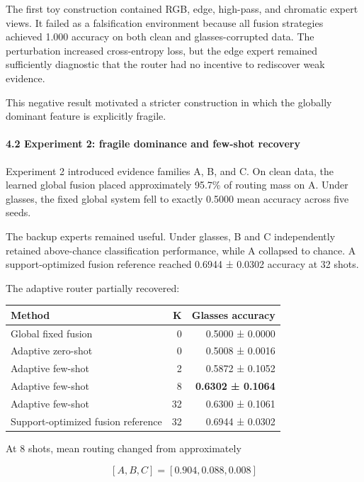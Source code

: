\documentclass[
  10pt,
]{article}
\begin{document}
The first toy construction contained RGB, edge, high-pass, and chromatic
expert views. It failed as a falsification environment because all
fusion strategies achieved 1.000 accuracy on both clean and
glasses-corrupted data. The perturbation increased cross-entropy loss,
but the edge expert remained sufficiently diagnostic that the router had
no incentive to rediscover weak evidence.

This negative result motivated a stricter construction in which the
globally dominant feature is explicitly fragile.

\hypertarget{experiment-2-fragile-dominance-and-few-shot-recovery}{%
\paragraph{4.2 Experiment 2: fragile dominance and few-shot
recovery}\label{experiment-2-fragile-dominance-and-few-shot-recovery}}

Experiment 2 introduced evidence families A, B, and C. On clean data,
the learned global fusion placed approximately 95.7\% of routing mass on
A. Under glasses, the fixed global system fell to exactly 0.5000 mean
accuracy across five seeds.

The backup experts remained useful. Under glasses, B and C independently
retained above-chance classification performance, while A collapsed to
chance. A support-optimized fusion reference reached 0.6944 ± 0.0302
accuracy at 32 shots.

The adaptive router partially recovered:

\begin{longtable}[]{@{}lrr@{}}
\toprule\noalign{}
Method & K & Glasses accuracy \\
\midrule\noalign{}
\endhead
\bottomrule\noalign{}
\endlastfoot
Global fixed fusion & 0 & 0.5000 ± 0.0000 \\
Adaptive zero-shot & 0 & 0.5008 ± 0.0016 \\
Adaptive few-shot & 2 & 0.5872 ± 0.1052 \\
Adaptive few-shot & 8 & \textbf{0.6302 ± 0.1064} \\
Adaptive few-shot & 32 & 0.6300 ± 0.1061 \\
Support-optimized fusion reference & 32 & 0.6944 ± 0.0302 \\
\end{longtable}

At 8 shots, mean routing changed from approximately

\[
[A,B,C]=[0.904,0.088,0.008]
\]
\end{document}
